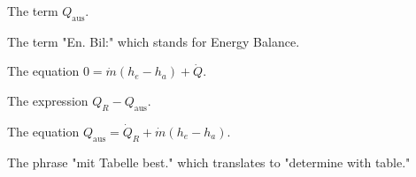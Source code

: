 The term \( Q_{\text{aus}} \).

The term "En. Bil:" which stands for Energy Balance.

The equation \( 0 = \dot{m} (h_e - h_a) + \dot{Q} \).

The expression \( Q_R - Q_{\text{aus}} \).

The equation \( Q_{\text{aus}} = \dot{Q}_R + \dot{m} (h_e - h_a) \).

The phrase "mit Tabelle best." which translates to "determine with table."